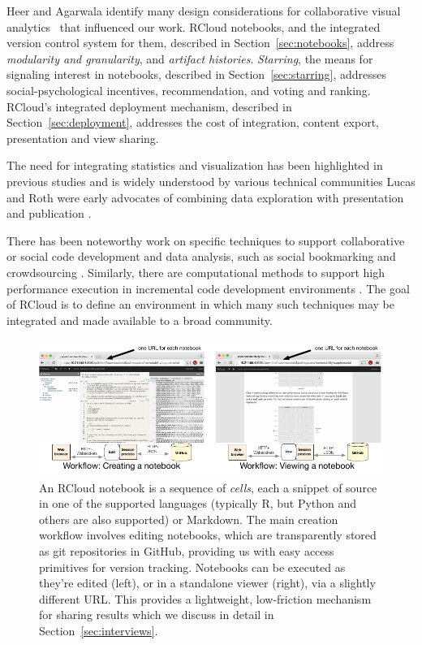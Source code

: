Heer and Agarwala identify many design considerations for
collaborative visual analytics~\cite{Heer:2008:DCF} that
influenced our work.
RCloud notebooks, and the integrated version control system for them,
described in Section~\ref{sec:notebooks}, address {\it modularity and
granularity}, and {\it artifact histories}.
\emph{Starring}, the means for signaling interest in notebooks, described in
Section~\ref{sec:starring}, addresses social-psychological incentives,
recommendation, and voting and ranking. RCloud's integrated deployment
mechanism, described in Section~\ref{sec:deployment}, addresses the cost of
integration, content export, presentation and view sharing.

The need for integrating statistics and visualization has been
highlighted in previous studies and is widely understood by
various technical communities \cite{Perer:2008:ISA}
Lucas and Roth were early advocates of combining
data exploration with presentation and publication \cite{Lucas:1996:EIV}.

There has been noteworthy work on specific techniques
to support collaborative or social code development and data analysis,
such as social bookmarking \cite{Millen:2006:DSB} \cite{Heer:2007:VAV}
and crowdsourcing \cite{Fast:2014:ECS}.
Similarly, there are computational methods to support high
performance execution in incremental code development
environments \cite{Guo:2010:TPI}.
The goal of RCloud is to define an environment in which many such
techniques may be integrated and made available to a broad community.
\begin{figure}
\centering
\includegraphics[width=.95\linewidth]{fig/notebook/notebook.pdf}
\caption{\label{fig:notebook}An RCloud notebook is a sequence of
\emph{cells}, each a snippet of source in one of the supported languages (typically R, but Python and others are also supported) or Markdown. The main creation workflow involves editing notebooks, which are transparently stored as git repositories in GitHub, providing us with easy access primitives for version tracking. Notebooks can be executed as they're edited (left), or in a standalone viewer (right), via a slightly different URL. This provides a lightweight, low-friction mechanism for sharing results which we discuss in detail in Section~\ref{sec:interviews}. }
\end{figure}


